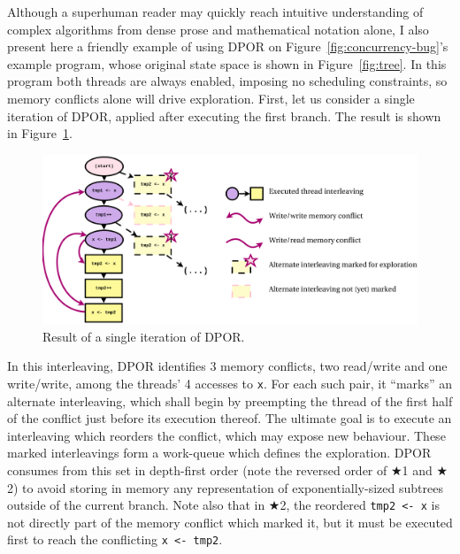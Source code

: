 Although a superhuman reader may quickly reach intuitive understanding
of complex algorithms from dense prose and mathematical notation alone,
I also present here a friendly example of using DPOR on Figure~\ref{fig:concurrency-bug}'s example program,
whose original state space is shown in Figure~\ref{fig:tree}.
In this program both threads are always enabled, imposing no scheduling constraints,
so memory conflicts alone will drive exploration.
First, let us consider a single iteration of DPOR, applied after executing the first branch.
The result is shown in Figure~\ref{fig:dpor-example-0}.

\begin{figure}[h]
	\begin{center}
		\includegraphics[width=\textwidth]{dpor-example-0.pdf}
	\end{center}
	\caption{Result of a single iteration of DPOR.}
	\label{fig:dpor-example-0}
\end{figure}

\newcommand\dporTA[1]{\hilight{darklavender}{#1}\xspace}
\newcommand\dporTB[1]{\hilight{goldish}     {#1}\xspace}
\newcommand\dporTAcode[1]{\dporTA{\ensuremath{\mathbf{T_1}}: {\tt #1}}\xspace}
\newcommand\dporTBcode[1]{\dporTB{\ensuremath{\mathbf{T_2}}: {\tt #1}}\xspace}

In this interleaving, DPOR identifies 3 memory conflicts, two read/write and one write/write,
among the threads' 4 accesses to {\tt x}.
For each such pair, it ``marks'' an alternate interleaving,
which shall begin by preempting the thread of the first half of the conflict just before its execution thereof.
The ultimate goal is to execute an interleaving which reorders the conflict, which may expose new behaviour.
These marked interleavings form a work-queue which defines the exploration.
DPOR consumes from this set in depth-first order
(note the reversed order of $\bigstar$1 and $\bigstar$2)
to avoid storing in memory any representation of exponentially-sized subtrees outside of the current branch.
Note also that in $\bigstar$2,
the reordered \dporTB{{\tt tmp2 <- x}} is not directly part of the memory conflict which marked it,
but it must be executed first to reach the conflicting \dporTB{{\tt x <- tmp2}}.

